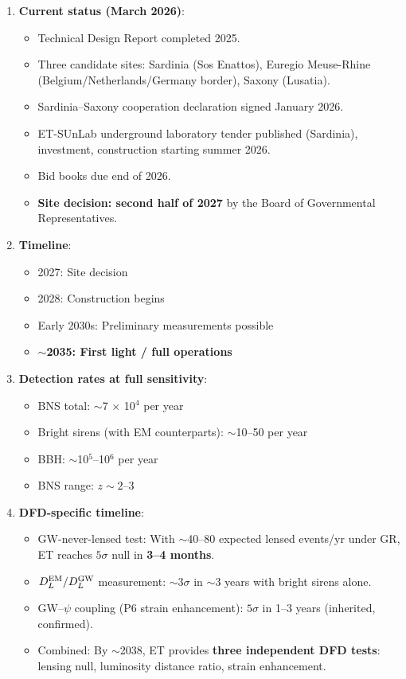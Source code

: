 \documentclass[11pt]{article}
\begin{document}
\begin{enumerate}
\item \textbf{Current status (March 2026)}:
  \begin{itemize}
  \item Technical Design Report completed 2025.
  \item Three candidate sites: Sardinia (Sos Enattos), Euregio Meuse-Rhine
    (Belgium/Netherlands/Germany border), Saxony (Lusatia).
  \item Sardinia--Saxony cooperation declaration signed January 2026.
  \item ET-SUnLab underground laboratory tender published (Sardinia),
     investment, construction starting summer 2026.
  \item Bid books due end of 2026.
  \item \textbf{Site decision: second half of 2027} by the Board of
    Governmental Representatives.
  \end{itemize}

\item \textbf{Timeline}:
  \begin{itemize}
  \item 2027: Site decision
  \item 2028: Construction begins
  \item Early 2030s: Preliminary measurements possible
  \item \textbf{$\sim$2035: First light / full operations}
  \end{itemize}

\item \textbf{Detection rates at full sensitivity}:
  \begin{itemize}
  \item BNS total: $\sim$7 $\times$ 10$^4$ per year
  \item Bright sirens (with EM counterparts): $\sim$10--50 per year
  \item BBH: $\sim$10$^5$--10$^6$ per year
  \item BNS range: $z \sim 2$--3
  \end{itemize}

\item \textbf{DFD-specific timeline}:
  \begin{itemize}
  \item GW-never-lensed test: With $\sim$40--80 expected lensed events/yr
    under GR, ET reaches $5\sigma$ null in \textbf{3--4 months}.
  \item $D_L^{\rm EM}/D_L^{\rm GW}$ measurement: $\sim$3$\sigma$ in
    $\sim$3 years with bright sirens alone.
  \item GW--$\psi$ coupling (P6 strain enhancement): $5\sigma$ in
    1--3 years (inherited, confirmed).
  \item Combined: By $\sim$2038, ET provides \textbf{three independent
    DFD tests}: lensing null, luminosity distance ratio, strain
    enhancement.
  \end{itemize}
\end{enumerate}
\end{document}
